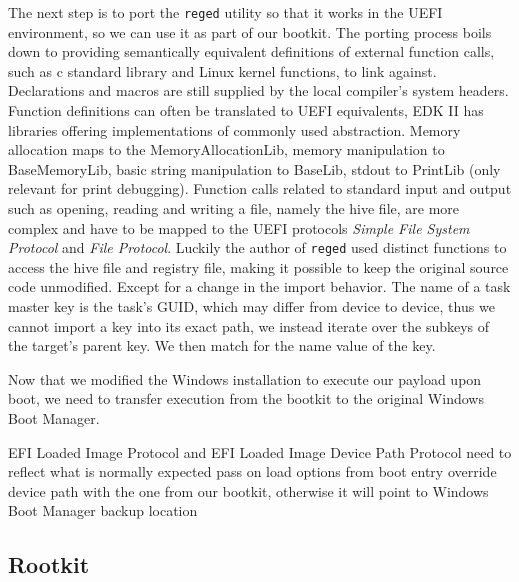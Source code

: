 The next step is to port the \lstinline{reged} utility so that it works in the UEFI environment, so we can use it as part of our bootkit.
The porting process boils down to providing semantically equivalent definitions of external function calls, such as c standard library and Linux kernel functions, to link against. Declarations and macros are still supplied by the local compiler's system headers. Function definitions can often be translated to \ac{UEFI} equivalents, \ac{EDK} II has libraries offering implementations of commonly used abstraction.
Memory allocation maps to the MemoryAllocationLib, memory manipulation to BaseMemoryLib, basic string manipulation to BaseLib, stdout to PrintLib (only relevant for print debugging).
Function calls related to standard input and output such as opening, reading and writing a file, namely the hive file, are more complex and have to be mapped to the \ac{UEFI} protocols \emph{Simple File System Protocol} and \emph{File Protocol}. Luckily the author of \lstinline{reged} used distinct functions to access the hive file and registry file, making it possible to keep the original source code unmodified.
Except for a change in the import behavior. The name of a task master key is the task's \ac{GUID}, which may differ from device to device, thus we cannot import a key into its exact path, we instead iterate over the subkeys of the target's parent key. We then match for the name value of the key.

Now that we modified the Windows installation to execute our payload upon boot, we need to transfer execution from the bootkit to the original Windows Boot Manager.


\ac{EFI} Loaded Image Protocol \cite[9.1]{uefi-spec} and \ac{EFI} Loaded Image Device Path Protocol \cite[9.2]{uefi-spec}
need to reflect what is normally expected
pass on load options from boot entry
override device path with the one from our bootkit, otherwise it will point to Windows Boot Manager backup location


\subsection{Rootkit}

